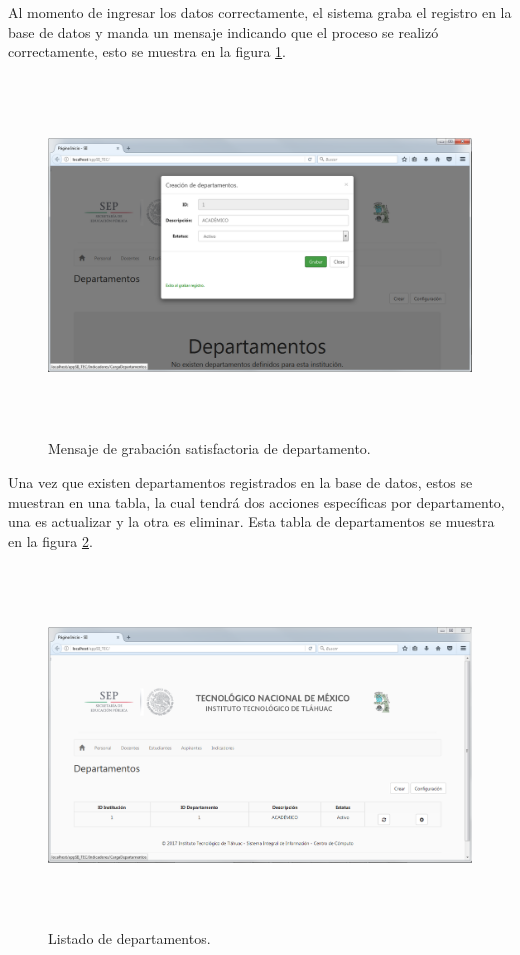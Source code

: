 		    Al momento de ingresar los datos correctamente, el sistema graba el registro en la base de datos y manda un mensaje indicando que el proceso se realiz\'o correctamente, esto se muestra en la figura \ref{img_DepartamentoGraba}.\\

		    \begin{figure}[]
		        \centering
		        \includegraphics[width=16cm, height=9.5cm]{figuras/DepartamentosGraba}
		        \caption{Mensaje de grabaci\'on satisfactoria de departamento.}
		        \label{img_DepartamentoGraba}
		    \end{figure}

		    Una vez que existen departamentos registrados en la base de datos, estos se muestran en una tabla, la cual tendr\'a dos acciones espec\'ificas por departamento, una es actualizar y la otra es eliminar. Esta tabla de departamentos se muestra en la figura \ref{fig_DepartamentoTabla}.\\

		    \begin{figure}[]
		        \centering
		        \includegraphics[width=16cm, height=9.5cm]{figuras/DepartamentosTabla}
		        \caption{Listado de departamentos.}
		        \label{fig_DepartamentoTabla}
		    \end{figure}
			

